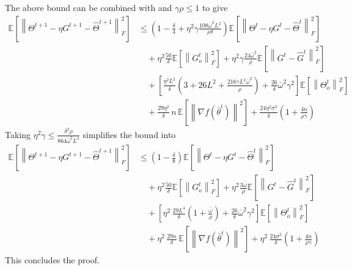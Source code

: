 \documentclass[10pt]{article} %
\theoremstyle{plain}
\theoremstyle{definition}
\theoremstyle{remark}
\newcommand{\prm}{\theta}
\newcommand{\bw}{\bar{\omega}}
\newcommand{\avgtheta}{\bar{\prm}}
\newcommand{\norm}[1]{\left\| #1 \right\|}
\newcommand{\nl}{\nonumber\\}
\begin{document}
The above bound can be combined with  and $\gamma \rho \leq 1$ to give
\begin{align}
    \mathbb{E} \left[ \norm{\Theta^{t+1}- \eta G^{t+1}- \hat{\Theta}^{t+1}}_F^2 \right] & \leq \left(1-\frac{\delta}{4} + \eta^2 \gamma \frac{108 \bw^2 L^2}{\rho \delta} \right) \mathbb{E} \left[ \norm{\Theta^t - \eta G^t - \hat{\Theta}^t}_F^2 \right] \nl 
    & \quad + \eta^2 \frac{50}{\delta} \mathbb{E} \left[ \norm{G_o^t}_F^2 \right] + \eta^2 \gamma \frac{24 \bw^2}{\rho} \mathbb{E} \left[ \norm{G^{t} - \hat{G}^t}_F^2 \right] \nl 
    & \quad + \left[ \frac{\eta^2 L^2}{\delta} \left( 3 + 26L^2 + \frac{216 \gamma L^2 \bw^2}{\rho} \right) + \frac{26}{\delta} \bw^2 \gamma^2 \right] \mathbb{E} \left[ \norm{\Theta_o^t}_F^2 \right] \nl 
    & \quad + \frac{29 \eta^2}{\delta} \, n \, \mathbb{E}  \left[ \norm{ \nabla f( \avgtheta^t) }^2 \right] + \frac{24 \eta^2 \sigma^2}{\delta} \left( 1 + \frac{4n}{\rho \gamma} \right) \nonumber
\end{align}
Taking  $\eta^2 \gamma \leq \frac{\delta^2 \rho}{864 \bw^2 L^2}$ simplifies the bound into
\begin{align}
    \mathbb{E} \left[ \norm{\Theta^{t+1}- \eta G^{t+1}- \hat{\Theta}^{t+1}}_F^2 \right] & \leq \left(1-\frac{\delta}{8} \right) \mathbb{E} \left[ \norm{\Theta^t - \eta G^t - \hat{\Theta}^t}_F^2 \right] \nl 
    & \quad + \eta^2 \frac{50}{\delta} \mathbb{E} \left[ \norm{G_o^t}_F^2 \right] + \eta^2 \frac{3 \bw}{\rho} \mathbb{E} \left[ \norm{G^{t} - \hat{G}^t}_F^2 \right] \nl 
    & \quad + \left[ \eta^2 \, \frac{29 L^4}{\delta} \left( 1 + \frac{ \bw}{\rho} \right) + \frac{26}{\delta} \bw^2 \gamma^2 \right] \mathbb{E} \left[ \norm{\Theta_o^t}_F^2 \right] \nl 
    & \quad + \eta^2 \, \frac{29n }{\delta} \, \mathbb{E}  \left[ \norm{ \nabla f( \avgtheta^t) }^2 \right] + \eta^2\, \frac{24 \sigma^2}{\delta} \left( 1 + \frac{4n}{\rho \gamma} \right) \nonumber
\end{align}
This concludes the proof.
\end{document}
